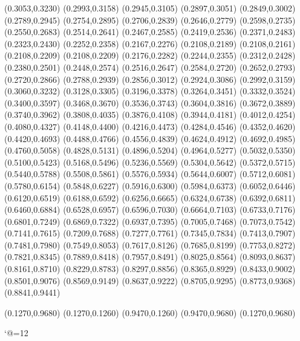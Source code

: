 \PST@Diamond(0.3053,0.3230)
\PST@Diamond(0.2993,0.3158)
\PST@Diamond(0.2945,0.3105)
\PST@Diamond(0.2897,0.3051)
\PST@Diamond(0.2849,0.3002)
\PST@Diamond(0.2789,0.2945)
\PST@Diamond(0.2754,0.2895)
\PST@Diamond(0.2706,0.2839)
\PST@Diamond(0.2646,0.2779)
\PST@Diamond(0.2598,0.2735)
\PST@Diamond(0.2550,0.2683)
\PST@Diamond(0.2514,0.2641)
\PST@Diamond(0.2467,0.2585)
\PST@Diamond(0.2419,0.2536)
\PST@Diamond(0.2371,0.2483)
\PST@Diamond(0.2323,0.2430)
\PST@Diamond(0.2252,0.2358)
\PST@Diamond(0.2167,0.2276)
\PST@Diamond(0.2108,0.2189)
\PST@Diamond(0.2108,0.2161)
\PST@Dashed(0.2108,0.2209)
(0.2108,0.2209)
(0.2176,0.2282)
(0.2244,0.2355)
(0.2312,0.2428)
(0.2380,0.2501)
(0.2448,0.2574)
(0.2516,0.2647)
(0.2584,0.2720)
(0.2652,0.2793)
(0.2720,0.2866)
(0.2788,0.2939)
(0.2856,0.3012)
(0.2924,0.3086)
(0.2992,0.3159)
(0.3060,0.3232)
(0.3128,0.3305)
(0.3196,0.3378)
(0.3264,0.3451)
(0.3332,0.3524)
(0.3400,0.3597)
(0.3468,0.3670)
(0.3536,0.3743)
(0.3604,0.3816)
(0.3672,0.3889)
(0.3740,0.3962)
(0.3808,0.4035)
(0.3876,0.4108)
(0.3944,0.4181)
(0.4012,0.4254)
(0.4080,0.4327)
(0.4148,0.4400)
(0.4216,0.4473)
(0.4284,0.4546)
(0.4352,0.4620)
(0.4420,0.4693)
(0.4488,0.4766)
(0.4556,0.4839)
(0.4624,0.4912)
(0.4692,0.4985)
(0.4760,0.5058)
(0.4828,0.5131)
(0.4896,0.5204)
(0.4964,0.5277)
(0.5032,0.5350)
(0.5100,0.5423)
(0.5168,0.5496)
(0.5236,0.5569)
(0.5304,0.5642)
(0.5372,0.5715)
(0.5440,0.5788)
(0.5508,0.5861)
(0.5576,0.5934)
(0.5644,0.6007)
(0.5712,0.6081)
(0.5780,0.6154)
(0.5848,0.6227)
(0.5916,0.6300)
(0.5984,0.6373)
(0.6052,0.6446)
(0.6120,0.6519)
(0.6188,0.6592)
(0.6256,0.6665)
(0.6324,0.6738)
(0.6392,0.6811)
(0.6460,0.6884)
(0.6528,0.6957)
(0.6596,0.7030)
(0.6664,0.7103)
(0.6733,0.7176)
(0.6801,0.7249)
(0.6869,0.7322)
(0.6937,0.7395)
(0.7005,0.7468)
(0.7073,0.7542)
(0.7141,0.7615)
(0.7209,0.7688)
(0.7277,0.7761)
(0.7345,0.7834)
(0.7413,0.7907)
(0.7481,0.7980)
(0.7549,0.8053)
(0.7617,0.8126)
(0.7685,0.8199)
(0.7753,0.8272)
(0.7821,0.8345)
(0.7889,0.8418)
(0.7957,0.8491)
(0.8025,0.8564)
(0.8093,0.8637)
(0.8161,0.8710)
(0.8229,0.8783)
(0.8297,0.8856)
(0.8365,0.8929)
(0.8433,0.9002)
(0.8501,0.9076)
(0.8569,0.9149)
(0.8637,0.9222)
(0.8705,0.9295)
(0.8773,0.9368)
(0.8841,0.9441)

\PST@Border(0.1270,0.9680)
(0.1270,0.1260)
(0.9470,0.1260)
(0.9470,0.9680)
(0.1270,0.9680)

\catcode`@=12
\fi
\endpspicture
